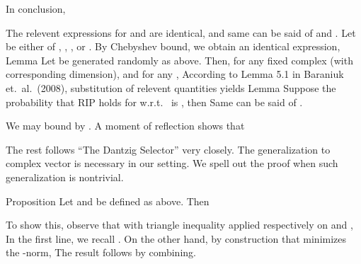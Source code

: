 In conclusion,

\stopsection

\startsection [title={RIP of Precoders and Combiners}]

The relevent expressions for  and  are identical, and same can be said of  and .
Let \m {\Phi} be either of , , , or .
By Chebyshev bound, we obtain an identical expression,
\Result
{Lemma}
{
Let \m {\Phi} be generated randomly as above.
Then, for any fixed complex  (with corresponding dimension), and for any ,
}
According to Lemma 5.1 in Baraniuk et.\ al.\ (2008), substitution of relevent quantities yields
\Result
{Lemma}
{
Suppose the probability that RIP holds for \m {\Phi} w.r.t.\  is , then
Same can be said of .
}

We may bound  by .
A moment of reflection shows that 


\stopsection

\startsection [title={Expected Square Error for Complex-Case DS}]

The rest follows ``The Dantzig Selector'' very closely.
The generalization to complex vector is necessary in our setting.
We spell out the proof when such generalization is nontrivial.

\Result
{Proposition}
{
Let  and  be defined as above.
Then
}

To show this, observe that with triangle inequality applied respectively on  and ,
In the first line, we recall .
On the other hand, by construction that  minimizes the -norm,
The result follows by combining.

